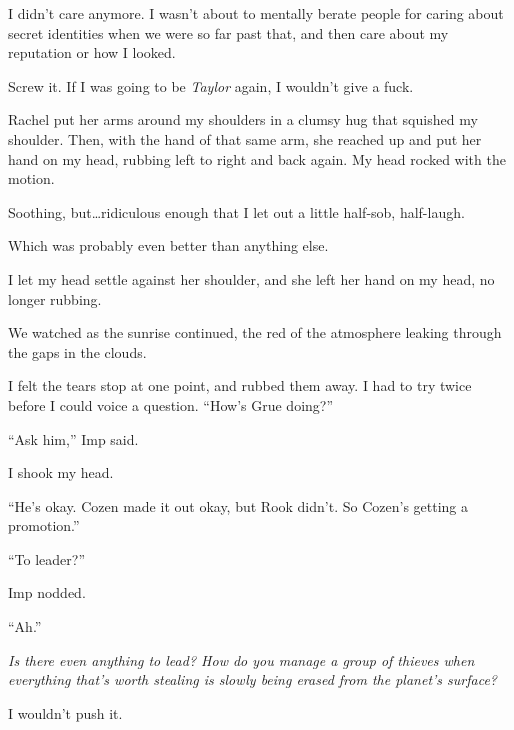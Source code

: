 I didn't care anymore.  I wasn't about to mentally berate people for caring about secret identities when we were so far past that, and then care about my reputation or how I looked.



Screw it.  If I was going to be \emph{Taylor} again, I wouldn't give a fuck.



Rachel put her arms around my shoulders in a clumsy hug that squished my shoulder.  Then, with the hand of that same arm, she reached up and put her hand on my head, rubbing left to right and back again.  My head rocked with the motion.



Soothing, but\ldots ridiculous enough that I let out a little half-sob, half-laugh.



Which was probably even better than anything else.



I let my head settle against her shoulder, and she left her hand on my head, no longer rubbing.



We watched as the sunrise continued, the red of the atmosphere leaking through the gaps in the clouds.



I felt the tears stop at one point, and rubbed them away.  I had to try twice before I could voice a question.  ``How's Grue doing?''



``Ask him,'' Imp said.



I shook my head.



``He's okay.  Cozen made it out okay, but Rook didn't.  So Cozen's getting a promotion.''



``To leader?''



Imp nodded.



``Ah.''



\emph{Is there even anything to lead?  How do you manage a group of thieves when everything that's worth stealing is slowly being erased from the planet's surface?}



I wouldn't push it.



